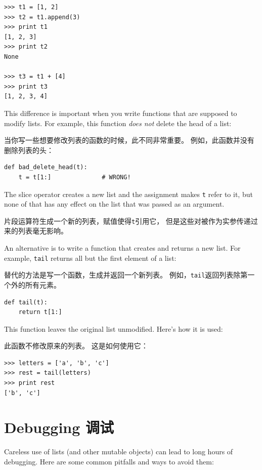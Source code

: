 \documentclass[10pt]{book}
\begin{document}
\begin{CJK}{UTF8}{gbsn}
\begin{verbatim}
>>> t1 = [1, 2]
>>> t2 = t1.append(3)
>>> print t1
[1, 2, 3]
>>> print t2
None

>>> t3 = t1 + [4]
>>> print t3
[1, 2, 3, 4]
\end{verbatim}

This difference is important when you write functions that
are supposed to modify lists.  For example, this function
{\em does not} delete the head of a list:

当你写一些想要修改列表的函数的时候，此不同非常重要。
例如，此函数并没有删除列表的头：

\begin{verbatim}
def bad_delete_head(t):
    t = t[1:]              # WRONG!
\end{verbatim}

The slice operator creates a new list and the assignment
makes {\tt t} refer to it, but none of that has any effect
on the list that was passed as an argument.

片段运算符生成一个新的列表，赋值使得{\tt t}引用它，
但是这些对被作为实参传递过来的列表毫无影响。

An alternative is to write a function that creates and
returns a new list.  For
example, {\tt tail} returns all but the first
element of a list:

替代的方法是写一个函数，生成并返回一个新列表。
例如，{\tt tail}返回列表除第一个外的所有元素。

\begin{verbatim}
def tail(t):
    return t[1:]
\end{verbatim}
%
This function leaves the original list unmodified.
Here's how it is used:

此函数不修改原来的列表。
这是如何使用它：

\begin{verbatim}
>>> letters = ['a', 'b', 'c']
>>> rest = tail(letters)
>>> print rest
['b', 'c']
\end{verbatim}



\section{Debugging 调试}

Careless use of lists (and other mutable objects)
can lead to long hours of debugging.  Here are some common
pitfalls and ways to avoid them:


\end{CJK}
\end{document}
